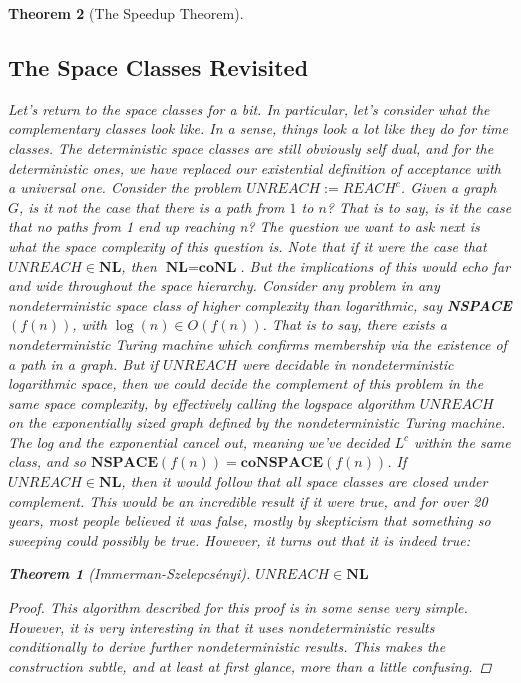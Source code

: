\documentclass{article}
\theoremstyle{definition}
\theoremstyle{plain}
\theoremstyle{theorem}
\newtheorem{theorem}{Theorem}[section]
\begin{document}
\begin{theorem}[The Speedup Theorem]
\subsection{The Space Classes Revisited}
\par Let's return to the space classes for a bit. In particular, let's consider what the complementary classes look like. In a sense, things look a lot like they do for time classes. The deterministic space classes are still obviously self dual, and for the deterministic ones, we have replaced our existential definition of acceptance with a universal one. Consider the problem $UNREACH := REACH^c$. Given a graph $G$, is it \textit{not} the case that there is a path from $1$ to $n$? That is to say, is it the case that \textit{no paths from 1 end up reaching n?} The question we want to ask next is what the space complexity of this question is. Note that if it were the case that $UNREACH \in \textbf{NL}$, then $\textbf{NL} = \textbf{coNL}$. But the implications of this would echo far and wide throughout the space hierarchy. Consider any problem in any nondeterministic space class of higher complexity than logarithmic, say \textbf{NSPACE$(f(n))$}, with $\log(n) \in O(f(n))$. That is to say, there exists a nondeterministic Turing machine which confirms membership via the existence of a path in a graph. But if $UNREACH$ were decidable in nondeterministic logarithmic space, then we could decide the complement of this problem in the same space complexity, by effectively calling the logspace algorithm $UNREACH$ on the exponentially sized graph defined by the nondeterministic Turing machine. The log and the exponential cancel out, meaning we've decided $L^c$ within the same class, and so $\textbf{NSPACE$(f(n))$} = \textbf{coNSPACE$(f(n))$}$. If $UNREACH \in \textbf{NL}$, then it would follow that \textit{all space classes are closed under complement.} This would be an incredible result if it were true, and for over 20 years, most people believed it was false, mostly by skepticism that something so sweeping could possibly be true. However, it turns out that it is indeed true:
\begin{theorem}[Immerman-Szelepcsényi]
    $UNREACH \in \textbf{NL}$
\end{theorem}
\begin{proof}
    This algorithm described for this proof is in some sense very simple. However, it is very interesting in that it uses nondeterministic results \textit{conditionally} to derive further nondeterministic results. This makes the construction subtle, and at least at first glance, more than a little confusing. 

\end{proof}
\end{theorem}
\end{document}
